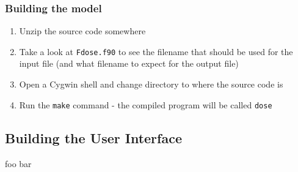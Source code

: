 \documentclass[10pt,a4paper,english]{article}
\newcommand{\bslash}{\symbol{92}}
\begin{document}
\subsubsection{Building the model}

\begin{enumerate}

\item Unzip the source code somewhere

\item Take a look at \texttt{F{\bslash}dose.f90} to see the filename that should be used for the 
input file (and what filename to expect for the output file)

\item Open a Cygwin shell and change directory to where the source code is

\item Run the \texttt{make} command - the compiled program will be called \texttt{dose}

\end{enumerate}


\subsection{Building the User Interface}

foo bar
\end{document}
